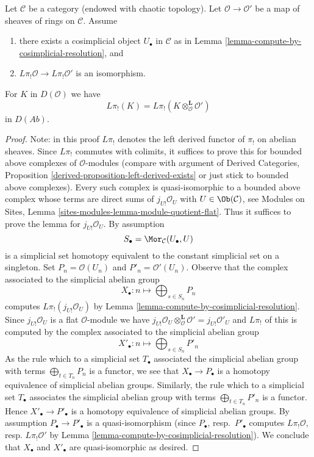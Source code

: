 \begin{lemma}
\label{lemma-O-homology-qis}
Let $\mathcal{C}$ be a category (endowed with chaotic topology).
Let $\mathcal{O} \to \mathcal{O}'$ be a map of sheaves of rings on
$\mathcal{C}$. Assume
\begin{enumerate}
\item there exists a cosimplicial object $U_\bullet$ in $\mathcal{C}$
as in Lemma \ref{lemma-compute-by-cosimplicial-resolution}, and
\item $L\pi_!\mathcal{O} \to L\pi_!\mathcal{O}'$ is an isomorphism.
\end{enumerate}
For $K$ in $D(\mathcal{O})$ we have
$$
L\pi_!(K) = L\pi_!(K \otimes_\mathcal{O}^\mathbf{L} \mathcal{O}')
$$
in $D(\textit{Ab})$.
\end{lemma}

\begin{proof}
Note: in this proof $L\pi_!$ denotes the left derived functor
of $\pi_!$ on abelian sheaves.
Since $L\pi_!$ commutes with colimits, it suffices
to prove this for bounded above complexes of $\mathcal{O}$-modules
(compare with argument of
Derived Categories, Proposition \ref{derived-proposition-left-derived-exists}
or just stick to bounded above complexes).
Every such complex is quasi-isomorphic to a bounded above complex
whose terms are direct sums of $j_{U!}\mathcal{O}_U$ with
$U \in \Ob(\mathcal{C})$, see
Modules on Sites, Lemma \ref{sites-modules-lemma-module-quotient-flat}.
Thus it suffices to prove the lemma
for $j_{U!}\mathcal{O}_U$. By assumption
$$
S_\bullet = \Mor_\mathcal{C}(U_\bullet, U)
$$
is a simplicial set homotopy equivalent to the constant simplicial
set on a singleton. Set $P_n = \mathcal{O}(U_n)$ and
$P'_n = \mathcal{O}'(U_n)$. Observe that the complex associated to the
simplicial abelian group
$$
X_\bullet : n \longmapsto \bigoplus\nolimits_{s \in S_n} P_n
$$
computes $L\pi_!(j_{U!}\mathcal{O}_U)$ by
Lemma \ref{lemma-compute-by-cosimplicial-resolution}.
Since $j_{U!}\mathcal{O}_U$ is a flat $\mathcal{O}$-module we have
$j_{U!}\mathcal{O}_U \otimes^\mathbf{L}_\mathcal{O} \mathcal{O}' =
j_{U!}\mathcal{O}'_U$ and $L\pi_!$ of this is computed by the complex
associated to the simplicial abelian group
$$
X'_\bullet : n \longmapsto \bigoplus\nolimits_{s \in S_n} P'_n
$$
As the rule which to a simplicial set $T_\bullet$ associated the simplicial
abelian group with terms $\bigoplus_{t \in T_n} P_n$ is a functor, we see
that $X_\bullet \to P_\bullet$ is a homotopy equivalence of simplicial
abelian groups. Similarly, the rule which to a simplicial set
$T_\bullet$ associates the simplicial abelian group with terms
$\bigoplus_{t \in T_n} P'_n$ is a functor. Hence $X'_\bullet \to P'_\bullet$
is a homotopy equivalence of simplicial abelian groups.
By assumption $P_\bullet \to P'_\bullet$ is a quasi-isomorphism
(since $P_\bullet$, resp.\ $P'_\bullet$ computes $L\pi_!\mathcal{O}$,
resp. $L\pi_!\mathcal{O}'$ by
Lemma \ref{lemma-compute-by-cosimplicial-resolution}).
We conclude that $X_\bullet$ and $X'_\bullet$ are quasi-isomorphic as desired.
\end{proof}


